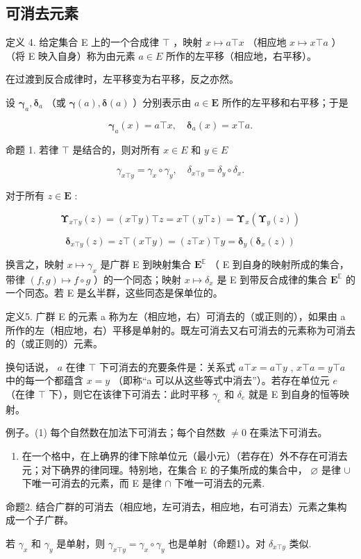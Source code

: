 \subsection{可消去元素}

定义 4. 给定集合 E 上的一个合成律 \(\top\) ，映射 \(x \mapsto a \top x\) （相应地 \(x \mapsto x \top a\) ）（将 E 映入自身）称为由元素 \(a \in E\) 所作的左平移（相应地，右平移）。

在过渡到反合成律时，左平移变为右平移，反之亦然。

设 \(\pmb{\gamma}_{a},\pmb{\delta}_{a}\) （或 \(\pmb {\gamma}(a),\pmb {\delta}(a)\) ）分别表示由 \(a\in \mathbf{E}\) 所作的左平移和右平移；于是

\[
\boldsymbol {\gamma} _ {a} (x) = a \top x, \quad \boldsymbol {\delta} _ {a} (x) = x \top a.
\]

命题 1. 若律 \(\top\) 是结合的，则对所有 \(x \in E\) 和 \(y \in E\)

\[
\gamma_ {x \top y} = \gamma_ {x} \circ \gamma_ {y}, \quad \delta_ {x \top y} = \delta_ {y} \circ \delta_ {x}.
\]

对于所有 \(z \in \mathbf{E}\) :

\[
\boldsymbol {\Upsilon} _ {x \top y} (z) = (x \top y) \top z = x \top (y \top z) = \boldsymbol {\Upsilon} _ {x} (\boldsymbol {\Upsilon} _ {y} (z))
\]

\[
\boldsymbol {\delta} _ {x \top y} (z) = z \top (x \top y) = (z \top x) \top y = \boldsymbol {\delta} _ {y} (\boldsymbol {\delta} _ {x} (z))
\]

换言之，映射 \(x \mapsto \gamma_x\) 是广群 E 到映射集合 \(\mathbf{E}^{\mathbb{E}}\) （ E 到自身的映射所成的集合，带律 \((f, g) \mapsto f \circ g\) ）的一个同态；映射 \(x \mapsto \delta_x\) 是 E 到带反合成律的集合 \(\mathbf{E}^{\mathbb{E}}\) 的一个同态。若 E 是幺半群，这些同态是保单位的。

定义5. 广群 E 的元素 a 称为左（相应地，右）可消去的（或正则的），如果由 a 所作的左（相应地，右）平移是单射的。既左可消去又右可消去的元素称为可消去的（或正则的）元素。

换句话说， \(a\) 在律 \(\top\) 下可消去的充要条件是：关系式 \(a \top x = a \top y\) , \(x \top a = y \top a\) 中的每一个都蕴含 \(x = y\) （即称“a 可以从这些等式中消去”）。若存在单位元 \(e\) （在律 \(\top\) 下），则它在该律下可消去：此时平移 \(\gamma_e\) 和 \(\delta_e\) 就是 E 到自身的恒等映射。

例子。(1) 每个自然数在加法下可消去；每个自然数 \(\neq 0\) 在乘法下可消去。

\begin{enumerate}
\def\labelenumi{(\arabic{enumi})}
\setcounter{enumi}{1}
\tightlist
\item
  在一个格中，在上确界的律下除单位元（最小元）（若存在）外不存在可消去元；对下确界的律同理。特别地，在集合 E 的子集所成的集合中， \(\varnothing\) 是律 \(\cup\) 下唯一可消去的元素，而 E 是律 \(\cap\) 下唯一可消去的元素.
\end{enumerate}

命题2. 结合广群的可消去（相应地，左可消去，相应地，右可消去）元素之集构成一个子广群。

若 \(\gamma_{x}\) 和 \(\gamma_{y}\) 是单射，则 \(\gamma_{x\top y} = \gamma_{x}\circ \gamma_{y}\) 也是单射（命题1）。对 \(\delta_{x\top y}\) 类似.

